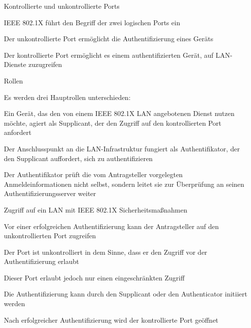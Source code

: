 \documentclass[a4paper]{article}
\begin{document}
\begin{multicols}{3}
      Kontrollierte und unkontrollierte Ports
      \begin{itemize*}
            \item IEEE 802.1X führt den Begriff der zwei logischen Ports ein
            \item Der unkontrollierte Port ermöglicht die Authentifizierung eines Geräts
            \item Der kontrollierte Port ermöglicht es einem authentifizierten Gerät, auf LAN-Dienste zuzugreifen
      \end{itemize*}

      Rollen
      \begin{itemize*}
            \item Es werden drei Hauptrollen unterschieden:
            \begin{itemize*}
                  \item Ein Gerät, das den von einem IEEE 802.1X LAN angebotenen Dienst nutzen möchte, agiert als Supplicant, der den Zugriff auf den kontrollierten Port anfordert
                  \item Der Anschlusspunkt an die LAN-Infrastruktur fungiert als Authentifikator, der den Supplicant auffordert, sich zu authentifizieren
                  \item Der Authentifikator prüft die vom Antragsteller vorgelegten Anmeldeinformationen nicht selbst, sondern leitet sie zur Überprüfung an seinen Authentifizierungsserver weiter
            \end{itemize*}
            \item Zugriff auf ein LAN mit IEEE 802.1X Sicherheitsmaßnahmen
            \begin{itemize*}
                  \item Vor einer erfolgreichen Authentifizierung kann der Antragsteller auf den unkontrollierten Port zugreifen
                  \item Der Port ist unkontrolliert in dem Sinne, dass er den Zugriff vor der Authentifizierung erlaubt
                  \item Dieser Port erlaubt jedoch nur einen eingeschränkten Zugriff
                  \item Die Authentifizierung kann durch den Supplicant oder den Authenticator initiiert werden
                  \item Nach erfolgreicher Authentifizierung wird der kontrollierte Port geöffnet
            \end{itemize*}
      \end{itemize*}


\end{multicols}
\end{document}
